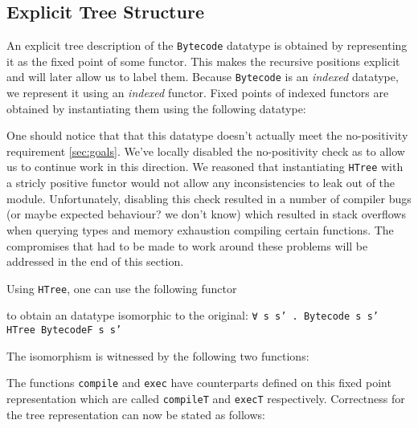 \documentclass[a4paper]{article}
\begin{document}
        
        \subsection{Explicit Tree Structure}
        
        An explicit tree description of the \texttt{Bytecode} datatype is obtained by representing it as the fixed point of 
        some functor. This makes the recursive positions explicit and will later allow us to label them. Because \texttt{Bytecode} 
        is an \emph{indexed} datatype, we represent it using an \emph{indexed} functor. Fixed points of indexed functors are obtained 
        by instantiating them using the following datatype:
        
        
        
        One should notice that that this datatype doesn't actually meet the no-positivity requirement \ref{sec:goals}. We've locally disabled the 
        no-positivity check as to allow us to continue work in this direction. We reasoned that instantiating \texttt{HTree} with a stricly 
        positive functor would not allow any inconsistencies to leak out of the module. Unfortunately, disabling this check resulted in a number
        of compiler bugs (or maybe expected behaviour? we don't know) which resulted in stack overflows when querying types and memory exhaustion
        compiling certain functions. The compromises that had to be made to work around these problems will be addressed in the end of this section.
        
        Using \texttt{HTree}, one can use the following functor
        
 
        to obtain an datatype isomorphic to the original: \texttt{∀ s s' . Bytecode s s' ~ HTree BytecodeF s s'}
        
        The isomorphism is witnessed by the following two functions:
        
        
        The functions \texttt{compile} and \texttt{exec} have counterparts defined on this fixed point representation 
        which are called \texttt{compileT} and \texttt{execT} respectively. Correctness for the tree representation can now be stated as follows:
        
\end{document}
